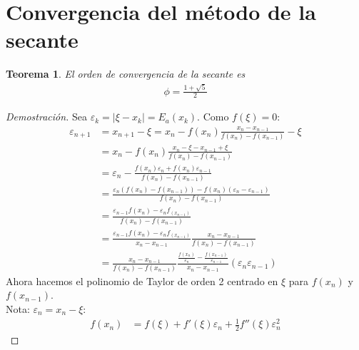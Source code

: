 \documentclass{article}
\newtheorem{theorem}{Teorema}
\begin{document}
\section{Convergencia del método de la secante}
\begin{theorem}
    El orden de convergencia de la secante es
    \begin{equation}
        \begin{split}
            \phi = \frac{1+\sqrt{5}}{2}
        \end{split}
    \end{equation}
\end{theorem}
\begin{proof}[Demostración]
    Sea $\varepsilon _{k} = |\xi -x_{k}| = E_{a}(x_{k})$. Como $f(\xi )=0$:
    \begin{equation}
        \begin{split}
            \varepsilon _{n+1}&=x_{n+1}-\xi = x_{n}-f(x_{n}) \frac{x_{n}-x_{n-1}}{f(x_{n})-f(x_{n-1})}
            - \xi \\
            &=x_{n} - f(x_{n}) \frac{x_{n}-\xi -x_{n-1}+\xi }{f(x_{n})-f(x_{n-1})}\\
            &=\varepsilon _{n} - \frac{f(x_{n})\varepsilon _{n}+f(x_{n})\varepsilon _{n-1}}
            {f(x_{n})-f(x_{n-1})}\\
            &= \frac{\varepsilon _{n}(f(x_{n})-f(x_{n-1}))- 
            f(x_{n})(\varepsilon _{n}-\varepsilon _{n-1})}{f(x_{n})-f(x_{n-1})}\\
            &=\frac{\varepsilon _{n-1}f(x_{n})-\varepsilon _{n}f_(x_{n-1})}{f(x_{n})-f(x_{n-1})}\\
            &=\frac{\varepsilon _{n-1}f(x_{n})-\varepsilon _{n}f_(x_{n-1})}{x_{n}-x_{n-1}}
            \frac{x_{n}-x_{n-1}}{f(x_{n})-f(x_{n-1})}\\
            &=\frac{x_{n}-x_{n-1}}{f(x_{n})-f(x_{n-1})} \frac{\frac{f(x_{n})}{\varepsilon _{n}}
            -\frac{f(x_{n-1})}{\varepsilon _{n-1}}}{x_{n}-x_{n-1}}(\varepsilon _{n}\varepsilon _{n-1})
        \end{split}
    \end{equation}
    Ahora hacemos el polinomio de Taylor de orden 2 centrado en $\xi $ para $f(x_{n})$ y $f(x_{n-1})$.\\
    Nota: $\varepsilon _{n} = x_{n}-\xi $:  
    \begin{equation}
        \begin{split}
            f(x_{n})&= f(\xi ) + f'(\xi )\varepsilon _{n} + \frac{1}{2}f''(\xi ) \varepsilon _{n}^{2}

\end{split}
\end{equation}
\end{proof}
\end{document}

